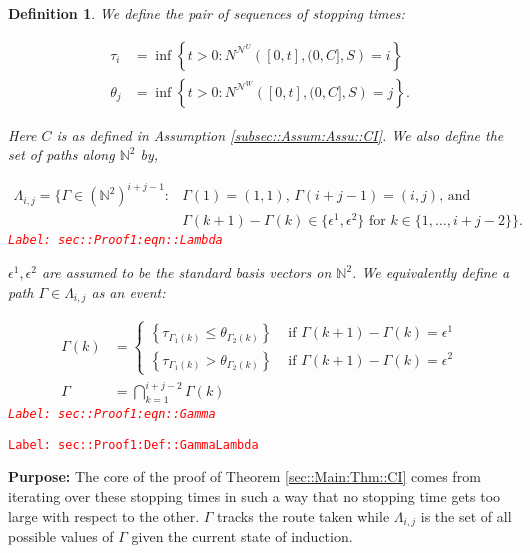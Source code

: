 \documentclass[12pt]{article}
\newcommand{\mb}{\mathbb}
\newcommand{\mc}{\mathcal}
\newcommand{\te}{\text}
\newcommand{\ep}{\epsilon}
\newcommand{\tr}{\textcolor{red}}
\newcommand{\labe}[1]{\tr{\texttt{Label: #1}}}
\newcommand{\purpose}{\textbf{Purpose: }}
\renewcommand{\U}{U}							%
\newcommand{\UU}{W}								%
\renewcommand{\S}{S}							%
\newcommand{\ev}{\ep}							%
\renewcommand{\t}{t}							%
\newcommand{\neigh}{\mc{N}}						%
\newcommand{\vind}[1]{^{#1}}					%
\newcommand{\const}{C}							%
\newcommand{\poiss}{N}							%
\newcommand{\indx}[1]{_{#1}}					%
\newcommand{\rt}{\tau}							%
\newcommand{\rtt}{\theta}						%
\renewcommand{\it}{k}							%
\newcommand{\apath}{\Gamma}						%
\newcommand{\pathset}[2]{\Lambda_{#1,#2}}		%
\newtheorem{defn}[thms]{Definition}
\begin{document}
\begin{defn}
We define the pair of sequences of stopping times:

\begin{align*}
\rt\indx{i} &= \inf \left\{\t > 0: \poiss\vind{\neigh\vind{\U}}\left([0,\t],(0,\const],\S\right) = i\right\}\\
\rtt\indx{j} &= \inf \left\{\t > 0: \poiss\vind{\neigh\vind{\UU}}\left([0,\t],(0,\const],\S\right) = j\right\}.
\end{align*}

Here \(\const\) is as defined in Assumption \ref{subsec::Assum:Assu::CI}. We also define the set of paths along \(\mb{N}^2\) by,

\begin{align}
\pathset{i}{j} = \{\apath \in (\mb{N}^2)^{i+j-1}: &\apath(1) = (1,1)\te{, } \apath(i+j-1) = (i,j)\te{, and } \nonumber\\
&\apath(\it+1) - \apath(\it)\in \{\ev\vind{1},\ev\vind{2}\}\te{ for }\it\in \{1,\dots, i+j-2\}\}.
\label{sec::Proof1:eqn::Lambda}
\end{align}
\labe{sec::Proof1:eqn::Lambda}

\(\ev\vind{1},\ev\vind{2}\) are assumed to be the standard basis vectors on \(\mb{N}^2\). We equivalently define a path \(\apath \in \pathset{i}{j}\) as an event:

\begin{align}
\apath(\it) &= \begin{cases}
\left\{\rt\indx{\apath\indx{1}(\it)} \leq \rtt\indx{\apath\indx{2}(\it)}\right\} &\te{ if } \apath(\it+1) - \apath(\it) = \ev\vind{1}\\
\left\{\rt\indx{\apath\indx{1}(\it)} > \rtt\indx{\apath\indx{2}(\it)}\right\} &\te{ if } \apath(\it+1) - \apath(\it) = \ev\vind{2}
\end{cases}\\
\apath &= \bigcap_{\it=1}^{i+j-2} \apath(\it)
\label{sec::Proof1:eqn::Gamma}
\end{align}
\labe{sec::Proof1:eqn::Gamma}
\label{sec::Proof1:Def::GammaLambda}
\end{defn}
\labe{sec::Proof1:Def::GammaLambda}

\purpose The core of the proof of Theorem \ref{sec::Main:Thm::CI} comes from iterating over these stopping times in such a way that no stopping time gets too large with respect to the other. \(\apath\) tracks the route taken while \(\pathset{i}{j}\) is the set of all possible values of \(\apath\) given the current state of induction.
\end{document}
